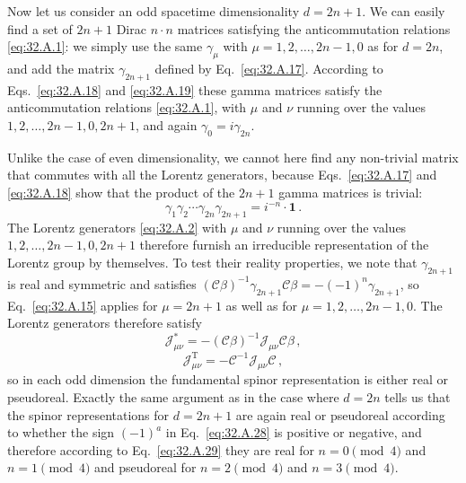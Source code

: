 Now let us consider an odd spacetime dimensionality \(d=2n+1\). We can
easily find a set of \(2n+1\) Dirac \(n\cdot n\) matrices satisfying the
anticommutation relations \eqref{eq:32.A.1}: we simply use the same
\(\gamma_\mu\) with \(\mu=1,2,\ldots,2n-1,0\) as for \(d=2n\), and add
the matrix \(\gamma_{2n+1}\) defined by Eq.~\eqref{eq:32.A.17}. According
to Eqs.~\eqref{eq:32.A.18} and \eqref{eq:32.A.19} these gamma matrices
satisfy the anticommutation relations \eqref{eq:32.A.1}, with \(\mu\) and
\(\nu\) running over the values \(1,2,\ldots,2n-1,0,2n+1\), and again
\(\gamma_0=i\gamma_{2n}\).

Unlike the case of even dimensionality, we cannot here find any non-trivial
matrix that commutes with all the Lorentz generators, because
Eqs.~\eqref{eq:32.A.17} and \eqref{eq:32.A.18} show that the product of the
\(2n+1\) gamma matrices is trivial:
\begin{equation}
  \gamma_1\gamma_2\cdots\gamma_{2n}\gamma_{2n+1}
  =i^{-n}\mathbin{\cdot}\mathbf{1}\,.
  \tag{32.A.36}\label{eq:32.A.36}
\end{equation}
The Lorentz generators \eqref{eq:32.A.2} with \(\mu\) and \(\nu\) running
over the values \(1,2,\ldots,2n-1,0,2n+1\) therefore furnish an irreducible
representation of the Lorentz group by themselves. To test their reality
properties, we note that \(\gamma_{2n+1}\) is real and symmetric and
satisfies
\((\mathcal C\beta)^{-1}\gamma_{2n+1}\mathcal C\beta
=-(-1)^n\gamma_{2n+1}\), so Eq.~\eqref{eq:32.A.15} applies for
\(\mu=2n+1\) as well as for \(\mu=1,2,\ldots,2n-1,0\). The Lorentz
generators therefore satisfy
\begin{equation}
  \mathcal J_{\mu\nu}^*
  =-(\mathcal C\beta)^{-1}\mathcal J_{\mu\nu}\mathcal C\beta\,,
  \tag{32.A.37}\label{eq:32.A.37}
\end{equation}
\begin{equation}
  \mathcal J_{\mu\nu}^{\mathrm T}
  =-\mathcal C^{-1}\mathcal J_{\mu\nu}\mathcal C\,,
  \tag{32.A.38}\label{eq:32.A.38}
\end{equation}
so in each odd dimension the fundamental spinor representation is either
real or pseudoreal. Exactly the same argument as in the case where \(d=2n\)
tells us that the spinor representations for \(d=2n+1\) are again real or
pseudoreal according to whether the sign \((-1)^a\) in
Eq.~\eqref{eq:32.A.28} is positive or negative, and therefore according to
Eq.~\eqref{eq:32.A.29} they are real for \(n=0\pmod 4\) and
\(n=1\pmod 4\) and pseudoreal for \(n=2\pmod 4\) and \(n=3\pmod 4\).

